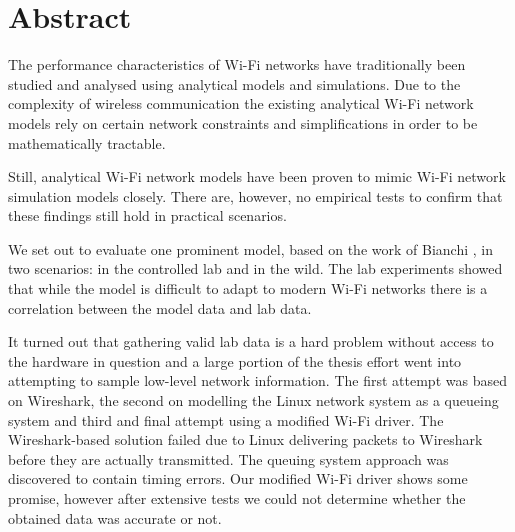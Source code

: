 
\chapter*{Abstract}

The performance characteristics of Wi-Fi networks have traditionally been
studied and analysed using analytical models and simulations. Due to the
complexity of wireless communication the existing analytical Wi-Fi network
models rely on certain network constraints and simplifications in order to be
mathematically tractable.

Still, analytical Wi-Fi network models have been proven to mimic Wi-Fi network
simulation models closely. There are, however, no empirical tests to confirm
that these findings still hold in practical scenarios.

We set out to evaluate one prominent model, based on the work of Bianchi
\cite{bianchi}, in two scenarios: in the controlled lab and in the wild. The lab
experiments showed that while the model is difficult to adapt to modern Wi-Fi
networks there is a correlation between the model data and lab data.

It turned out that gathering valid lab data is a hard problem without access
to the hardware in question and a large portion of the thesis effort went into
attempting to sample low-level network information. The first attempt was
based on Wireshark, the second on modelling the Linux network system as a
queueing system and third and final attempt using a modified Wi-Fi driver. The
Wireshark-based solution failed due to Linux delivering packets to Wireshark
before they are actually transmitted. The queuing system approach was
discovered to contain timing errors. Our modified Wi-Fi driver shows some
promise, however after extensive tests we could not determine whether the
obtained data was accurate or not.




